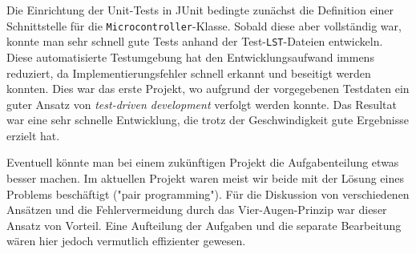 \documentclass[a4paper]{article}
\begin{document}
Die Einrichtung der Unit-Tests in JUnit bedingte zunächst die Definition einer Schnittstelle für die \texttt{Microcontroller}-Klasse.
Sobald diese aber vollständig war, konnte man sehr schnell gute Tests anhand der Test-\texttt{LST}-Dateien entwickeln.
Diese automatisierte Testumgebung hat den Entwicklungsaufwand immens reduziert, da Implementierungsfehler schnell erkannt und beseitigt werden konnten.
Dies war das erste Projekt, wo aufgrund der vorgegebenen Testdaten ein guter Ansatz von \textit{test-driven development} verfolgt werden konnte.
Das Resultat war eine sehr schnelle Entwicklung, die trotz der Geschwindigkeit gute Ergebnisse erzielt hat.

Eventuell könnte man bei einem zukünftigen Projekt die Aufgabenteilung etwas besser machen.
Im aktuellen Projekt waren meist wir beide mit der Lösung eines Problems beschäftigt ("pair programming").
Für die Diskussion von verschiedenen Ansätzen und die Fehlervermeidung durch das Vier-Augen-Prinzip war dieser Ansatz von Vorteil.
Eine Aufteilung der Aufgaben und die separate Bearbeitung wären hier jedoch vermutlich effizienter gewesen.
\end{document}
